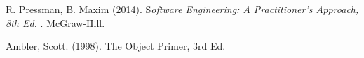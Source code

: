 {\begin{latin}
\begin{thebibliography}{9}

	R. Pressman,   B. Maxim (2014).
	S\textit{oftware Engineering: A Practitioner’s Approach, 8th Ed. }.
	McGraw-Hill.

	Ambler, Scott. (1998). The Object Primer, 3rd Ed.
	 
	
	
\end{thebibliography}
\endgroup
\end{latin}

}
